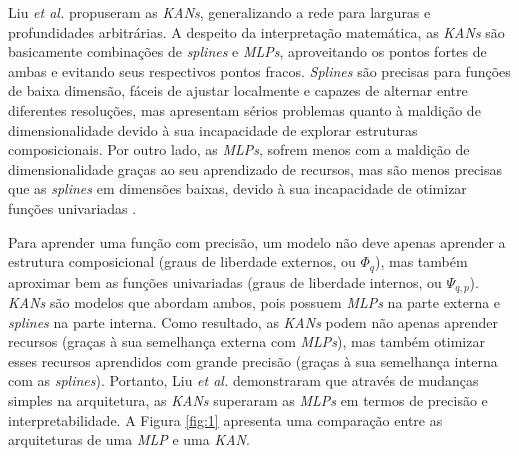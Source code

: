 \documentclass[journal]{IEEEtran}
\begin{document}


Liu \textit{et al.} \cite{liu} propuseram as \textit{KANs}, generalizando a rede para larguras e profundidades arbitrárias. A despeito da interpretação matemática, as \textit{KANs} são basicamente combinações de \textit{splines} e \textit{MLPs}, aproveitando os pontos fortes de ambas e evitando seus respectivos pontos fracos. \textit{Splines} são precisas para funções de baixa dimensão, fáceis de ajustar localmente e capazes de alternar entre diferentes resoluções, mas apresentam sérios problemas quanto à maldição de dimensionalidade devido à sua incapacidade de explorar estruturas composicionais. Por outro lado, as \textit{MLPs}, sofrem menos com a maldição de dimensionalidade graças ao seu aprendizado de recursos, mas são menos precisas que as \textit{splines} em dimensões baixas, devido à sua incapacidade de otimizar funções univariadas \cite{liu}.

Para aprender uma função com precisão, um modelo não deve apenas aprender a estrutura composicional (graus de liberdade externos, ou $\Phi_q$), mas também aproximar bem as funções univariadas (graus de liberdade internos, ou $\Psi_{q,p}$). \textit{KANs} são modelos que abordam ambos, pois possuem \textit{MLPs} na parte externa e \textit{splines} na parte interna. Como resultado, as \textit{KANs} podem não apenas aprender recursos (graças à sua semelhança externa com \textit{MLPs}), mas também otimizar esses recursos aprendidos com grande precisão (graças à sua semelhança interna com as \textit{splines}). Portanto, Liu \textit{et al.} \cite{liu} demonstraram que através de mudanças simples na arquitetura, as \textit{KANs} superaram as \textit{MLPs} em termos de precisão e interpretabilidade. A Figura \ref{fig:1} apresenta uma comparação entre as arquiteturas de uma \textit{MLP} e uma \textit{KAN}.
\end{document}

